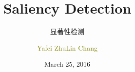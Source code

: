 \documentclass[notheorems,serif,table,compress]{beamer}  %
\begin{document}
\title{Saliency Detection}
\subtitle{显著性检测}
\author[]{\textcolor{olive}{Yafei Zhu\quad Lin Chang}}
\date[March 25, 2016]{March 25, 2016}
\frame{ \titlepage }
\def\hilite<#1>{\temporal<#1>{\color{blue!15}}{\color{black}}{\color{black}}}
\newcommand{\shadow}[2][purple]{\hskip5pt\shadowbox{\color{#1}\small \kai #2\vspace{3mm}}}
\newcommand{\colorrbox}[2][purple]{\doublebox{\color{#1}\small \kai#2}}

\end{document}
